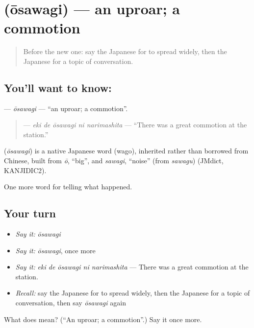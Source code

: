 \section[\texorpdfstring{\ja{おおさわぎ} (ōsawagi)}{おおさわぎ (ōsawagi)}]{ (ōsawagi) — an uproar; a commotion}

\label{lesson:JA-C281-ousawagi}



\begin{quote}
Before the new one: say the Japanese for to spread widely, then the Japanese for a topic of conversation.
\end{quote}

\subsection*{You'll want to know: }
\textbf{} — \emph{ōsawagi} — \textquotedblleft{}an uproar; a commotion\textquotedblright{}.

\begin{quote}
\textbf{  } — \emph{eki de ōsawagi ni narimashita} — \textquotedblleft{}There was a great commotion at the station.\textquotedblright{}
\end{quote}

\begin{cousinweb}
\textbf{} (\emph{ōsawagi}) is a native Japanese word (wago), inherited rather than borrowed from Chinese, built from \emph{ō}, \textquotedblleft{}big\textquotedblright{}, and \emph{sawagi}, \textquotedblleft{}noise\textquotedblright{} (from \emph{sawagu}) (JMdict, KANJIDIC2).
\end{cousinweb}

\begin{grammarlens}[title={What you've built}]
One more word for telling what happened.
\end{grammarlens}

\subsection*{Your turn}
\begin{itemize}
\raggedright
  \item \emph{Say it:} \emph{ōsawagi}
  \item \emph{Say it:} \emph{ōsawagi}, once more
  \item \emph{Say it:} \emph{eki de ōsawagi ni narimashita} — There was a great commotion at the station.
  \item \emph{Recall:} say the Japanese for to spread widely, then the Japanese for a topic of conversation, then say \emph{ōsawagi} again
\end{itemize}

\begin{tcolorbox}[breakable,colback=teal!4,colframe=teal!35!black,title={Before you move on}]
What does  mean? (\textquotedblleft{}An uproar; a commotion\textquotedblright{}.) Say it once more.
\end{tcolorbox}
